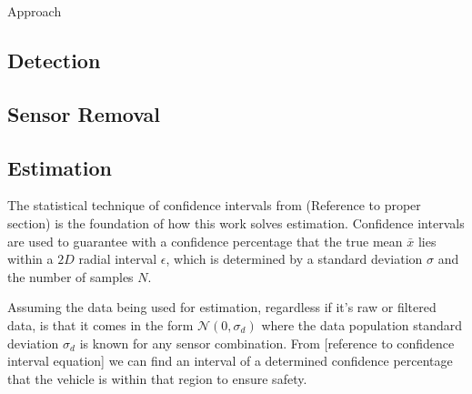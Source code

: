 
\begin{section}{Approach}
\label{sec:approach}



\subsection{Detection}


\subsection{Sensor Removal}


\subsection{Estimation}
The statistical technique of confidence intervals from (Reference to proper section) is the foundation of how this work solves estimation. Confidence intervals are used to guarantee with a confidence percentage that the true mean $\bar{x}$ lies within a $2D$ radial interval $\epsilon$, which is determined by a standard deviation $\sigma$ and the number of samples $N$. 

Assuming the data being used for estimation, regardless if it's raw or filtered data, is that it comes in the form $\mathcal{N}(0,\sigma_d)$ where the data population standard deviation $\sigma_d$ is known for any sensor combination. From [reference to confidence interval equation] we can find an interval of a determined confidence percentage that the vehicle is within that region to ensure safety. 


\end{section}
